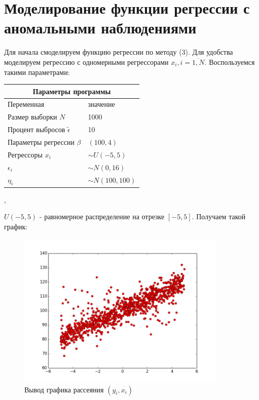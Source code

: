 \documentclass[12pt]{article}
\begin{document}
\section{Моделирование функции регрессии с аномальными наблюдениями}
Для начала смоделируем функцию регрессии по методу (3). Для удобства моделируем регрессию с одномерными регрессорами $x_i, i=\overline{1,N}$.\hfill\break
Воспользуемся такими параметрами:\hfill\break
\begin{center}
\begin{tabular}{|p{5cm}|p{5cm}|}
    \hline
    \multicolumn{2}{|c|}{Параметры программы} \\
    \hline
    Переменная&значение\\
    \hline
    Размер выборки $N$& 1000\\
    \hline
    Процент выбросов $\widetilde{\epsilon}$& 10\\
    \hline
    Параметры регрессии $\beta$& $(100,4)$\\
    \hline
    Регрессоры $x_i$ & $\sim U(-5,5)$\\
    \hline
    $\epsilon_i$&$\sim N(0,16)$\\
    \hline
    $\eta_i$&$\sim N(100,100)$\\
    \hline
\end{tabular},
\end{center}
$U(-5,5)$ - равномерное распределение на отрезке $[-5,5]$.\hfill\break
Получаем такой график:\hfill\break
\begin{figure}[ht!]
    \centering
    \includegraphics[width=100mm]{graphic.png}
    \caption{Вывод графика рассеяния $(y_i,x_i)$\label{overflow}}
\end{figure}
\newpage
\end{document}
